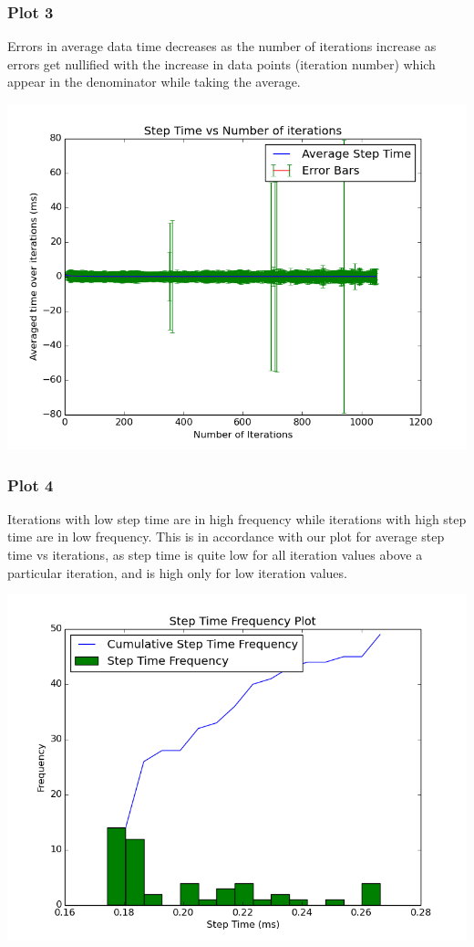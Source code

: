 \documentclass[11pt]{article}
\begin{document}
\subsubsection{Plot 3}
Errors in average data time decreases as the number of iterations increase as errors get nullified with the increase in data points (iteration number) which appear in the denominator while taking the average.\\
\begin{center}
\includegraphics[scale=0.5]{../plots/g21_plot03.png}
\end{center}
\subsubsection{Plot 4}
Iterations with low step time are in high frequency while iterations with high step time are in low frequency. This is in accordance
with our plot for average step time vs iterations, as step time is quite low for all iteration values above a particular iteration, and
is high only for low iteration values.\\
\begin{center}
\includegraphics[scale=0.5]{../plots/g21_plot04.png}
\end{center}
\end{document}
